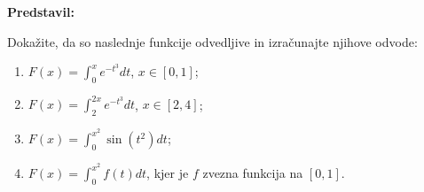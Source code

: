 \textbf{Predstavil:} 

Dokažite, da so naslednje funkcije odvedljive in izračunajte njihove odvode: 
\begin{enumerate}
  \item $\displaystyle F(x) = \int_{0}^{x} e^{-t^{3}} dt$, $x \in [0,1]$;
  \item $\displaystyle F(x) = \int_{2}^{2x} e^{-t^{3}} dt$, $x \in [2,4]$;
  \item $\displaystyle F(x) = \int_{0}^{x^{2}} \sin(t^{2}) dt$;
  \item $\displaystyle F(x) = \int_{0}^{x^{2}} f(t) dt$, kjer je $f$ zvezna funkcija na $[0,1]$.
\end{enumerate}
